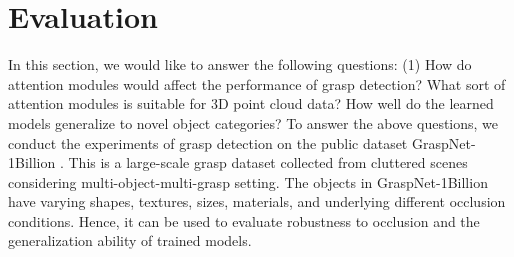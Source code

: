\section{Evaluation}
\label{sec:Experiments}

In this section, we would like to answer the following questions: (1) How do attention modules would affect the performance of grasp detection? What sort of attention modules is suitable for 3D point cloud data? How well do the learned models generalize to novel object categories? To answer the above questions, we conduct the experiments of grasp detection on the public dataset GraspNet-1Billion \cite{fang2020graspnet}. This is a large-scale grasp dataset collected from cluttered scenes considering multi-object-multi-grasp setting. The objects in GraspNet-1Billion have varying shapes, textures, sizes, materials, and underlying different occlusion conditions. Hence, it can be used to evaluate robustness to occlusion and the generalization ability of trained models.



